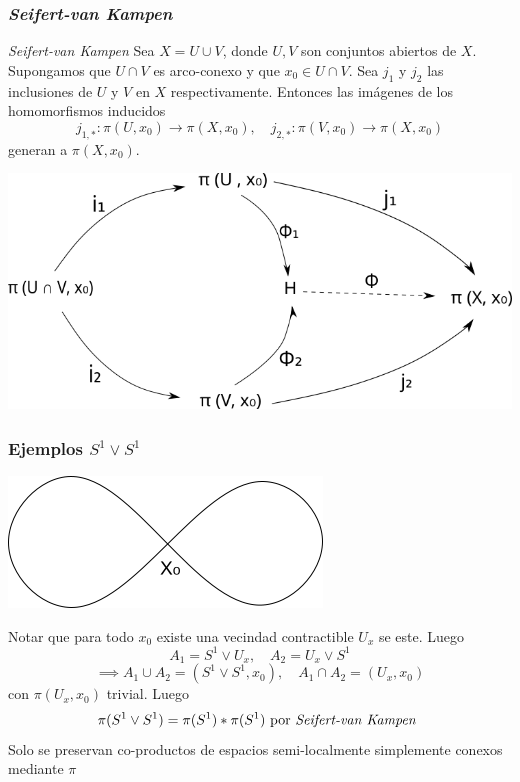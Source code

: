 \documentclass[xetex,mathserif,serif]{beamer}
\newcommand{\vank}{\emph{Seifert-van Kampen} }
\begin{document}
  \begin{frame}
    \frametitle{\vank}
    \begin{block}{\vank}
      Sea \(X = U \cup V\), donde \(U,V\) son conjuntos abiertos de \(X\).
      Supongamos que \(U \cap V\) es arco-conexo y que \(x_0 \in U \cap V\).
      Sea \(j_1\) y \(j_2\) las inclusiones de \(U\) y \(V\) en \(X\)
      respectivamente. Entonces las imágenes de los homomorfismos inducidos
      \[ j_{1,*} : \pi (U, x_0) \to \pi (X, x_0), \quad j_{2,*} : \pi
      (V, x_0) \to \pi (X, x_0) \]
      generan a \(\pi (X,x_0)\).

      \begin{center}
        \includegraphics[scale=.35]{../tesis/imagenes/van.png}
      \end{center}
    \end{block}
  \end{frame}

  \begin{frame}
    \frametitle{Ejemplos \(S^1 \vee S^1\)}
    \begin{center}
      \includegraphics[scale=0.4]{../tesis/imagenes/figura8.png}
    \end{center}
    \pause
    Notar que para todo \(x_0\) existe una vecindad contractible \(U_x\)
    se este. Luego
    \[ A_1 = S^1 \vee U_x , \quad A_2 = U_x \vee S^1 \]
    \[ \implies A_1 \cup A_2 = (S^1 \vee S^1, x_0) , \quad A_1 \cap A_2 = (U_x , x_0) \]
    con \(\pi (U_x , x_0)\) trivial. Luego
    \[ \pi (S^1 \vee S^1) = \pi (S^1) * \pi (S^1) \text{ por \vank}\]
    \pause
    Solo se preservan co-productos de espacios semi-localmente
    simplemente conexos mediante \(\pi\)
  \end{frame}
\end{document}
